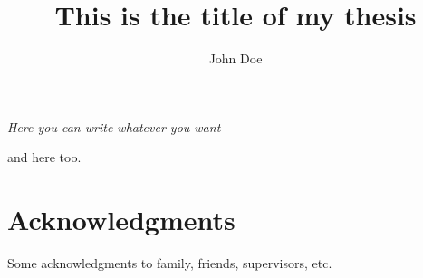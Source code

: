 \documentclass{styles/tthesis}
\title{This is the title of my thesis}
\author{John Doe}
\begin{document}


\printfrontpage

\begin{flushright}
\thispagestyle{empty}
\null{}
{\it Here you can write whatever you want

\vspace{10pt}
and here too.
}
\null
\end{flushright}
%
\thispagestyle{empty}
\mbox{}
\newpage
%
\chapter*{Acknowledgments}

Some acknowledgments to family, friends, supervisors, etc.

\thispagestyle{empty}
\mbox{}
\newpage


\tableofcontents
\listoffigures
\listoftables

\mainmatter











\label{Bibliography}


\end{document}
